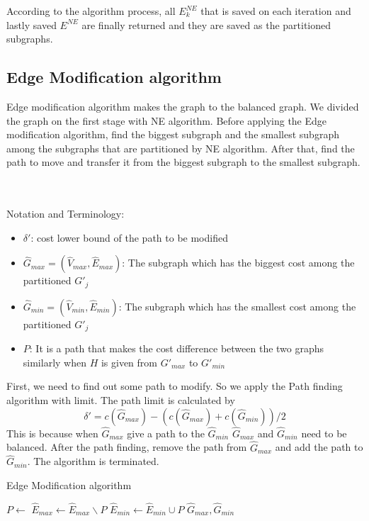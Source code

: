 \documentclass{article}
\begin{document}
According to the algorithm process, all $E^{NE}_k$ that is saved on each iteration and lastly saved $E^{NE}$ are finally returned and they are saved as the partitioned subgraphs.

\subsection{Edge Modification algorithm}
Edge modification algorithm makes the graph to the balanced graph. We divided the graph on the first stage with NE algorithm. Before applying the Edge modification algorithm, find the biggest subgraph and the smallest subgraph among the subgraphs that are partitioned by NE algorithm. After that, find the path to move and transfer it from the biggest subgraph to the smallest subgraph.

\\
\\ Notation and Terminology:
\begin{itemize}
    \item $\delta'$: cost lower bound of the path to be modified
    \item $\hat{G}_{max}=(\hat{V}_{max},\hat{E}_{max})$: The subgraph which has the biggest cost among the partitioned $G'_j$
    \item $\hat{G}_{min}=(\hat{V}_{min},\hat{E}_{min})$: The subgraph which has the smallest cost among the partitioned $G'_j$
    \item $P$: It is a path that makes the cost difference between the two graphs similarly when $H$ is given from $G'_{max}$ to $G'_{min}$
\end{itemize}

First, we need to find out some path to modify. So we apply the Path finding algorithm with limit. The path limit is calculated by 
\begin{equation}
    \delta' = c(\hat{G}_{max})-(c(\hat{G}_{max})+c(\hat{G}_{min}))/2
\end{equation}
This is because when $\hat{G}_{max}$ give a path to the $\hat{G}_{min}$ $\hat{G}_{max}$ and $\hat{G}_{min}$ need to be balanced. After the path finding, remove the path from $\hat{G}_{max}$ and add the path to $\hat{G}_{min}$. The algorithm is terminated.

\begin{algorithm}
    \caption{Edge Modification algorithm}
    \begin{algorithmic}[1]
        \State $P \leftarrow$ 
        \State $\hat{E}_{max} \leftarrow \hat{E}_{max} \backslash P$
        \State $\hat{E}_{min} \leftarrow \hat{E}_{min} \cup P$
        \State \Return $\hat{G}_{max},\hat{G}_{min}$
    \EndProcedure
    \end{algorithmic}
    
\end{algorithm}
\end{document}
